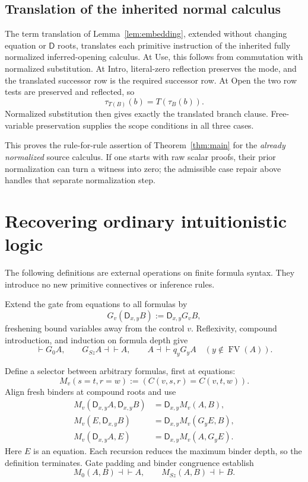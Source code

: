\documentclass[11pt]{article}
\theoremstyle{definition}
\theoremstyle{remark}
\newcommand{\D}{\mathsf D}
\newcommand{\FV}{\operatorname{FV}}
\newcommand{\der}{\vdash}
\newcommand{\inter}{\dashv\vdash}
\begin{document}
\subsection{Translation of the inherited normal calculus}

The term translation of Lemma~\ref{lem:embedding}, extended
without changing equation or $\D$ roots, translates each
primitive instruction of the inherited fully normalized
inferred-opening calculus. At Use, this follows from
commutation with normalized substitution. At Intro,
literal-zero reflection preserves the mode, and the
translated successor row is the required successor row.
At Open the two row tests are preserved and reflected,
so
\[
 \tau_{T(B)}(b)=T(\tau_B(b)).
\]
Normalized substitution then gives exactly the translated
branch clause. Free-variable preservation supplies the
scope conditions in all three cases.

This proves the rule-for-rule assertion of
Theorem~\ref{thm:main} for the \emph{already normalized}
source calculus. If one starts with raw scalar proofs,
their prior normalization can turn a witness into zero;
the admissible case repair above handles that separate
normalization step.

\section{Recovering ordinary intuitionistic logic}
\label{sec:macros}

The following definitions are external operations on
finite formula syntax. They introduce no new primitive
connectives or inference rules.

Extend the gate from equations to all formulas by
\[
 G_v(\D_{x,y}B):=\D_{x,y}G_vB,
\]
freshening bound variables away from the control $v$.
Reflexivity, compound introduction, and induction on
formula depth give
\[
 \der G_0A,\qquad G_{Sz}A\inter A,\qquad
 A\inter q_yG_yA
 \quad(y\notin\FV(A)).
 \tag{Gate}
\]

Define a selector between arbitrary formulas, first at
equations:
\[
 M_v(s=t,r=w):=(C(v,s,r)=C(v,t,w)).
\]
Align fresh binders at compound roots and use
\begin{align*}
 M_v(\D_{x,y}A,\D_{x,y}B)&=\D_{x,y}M_v(A,B),\\
 M_v(E,\D_{x,y}B)&=\D_{x,y}M_v(G_yE,B),\\
 M_v(\D_{x,y}A,E)&=\D_{x,y}M_v(A,G_yE).
\end{align*}
Here $E$ is an equation. Each recursion reduces the
maximum binder depth, so the definition terminates.
Gate padding and binder congruence establish
\[
 M_0(A,B)\inter A,\qquad M_{Sz}(A,B)\inter B.
\]
\end{document}
